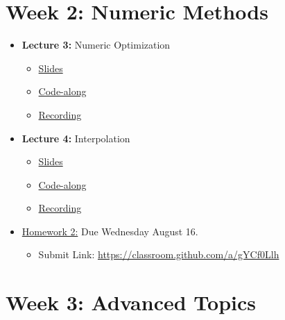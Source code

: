 \documentclass[
]{book}
\providecommand{\tightlist}{%
  \setlength{\itemsep}{0pt}\setlength{\parskip}{0pt}}
\begin{document}
\hypertarget{week-2-numeric-methods-1}{%
\section{Week 2: Numeric Methods}\label{week-2-numeric-methods-1}}

\begin{itemize}
\tightlist
\item
  \textbf{Lecture 3:} Numeric Optimization

  \begin{itemize}
  \tightlist
  \item
    \href{https://kevinghunt.github.io/ComputationCamp/lectures/Lecture3.html}{Slides}
  \item
    \href{https://kevinghunt.github.io/ComputationCamp/codealongs/CodeAlong3.jl}{Code-along}
  \item
    \href{https://uwmadison.zoom.us/rec/share/xD1LsrLsUF8XtJUjPTVDA_2d52EKgQTF1a6Dc3lBOSB7JlRk4PMUi_h0oMRnMtb5.VW6mJ7BkoiC6riUk}{Recording}
  \end{itemize}
\item
  \textbf{Lecture 4:} Interpolation

  \begin{itemize}
  \tightlist
  \item
    \href{https://kevinghunt.github.io/ComputationCamp/lectures/Lecture4.html}{Slides}
  \item
    \href{https://kevinghunt.github.io/ComputationCamp/codealongs/CodeAlong4.jl}{Code-along}
  \item
    \href{https://uwmadison.zoom.us/rec/share/YNnLYBVpnTSQsMTHQGDDWx2n89gURdYXzVWM8dRyV4o91bAfmCkC8q1IT3f-jo3B.msXmwKB-ZcXcIZRL}{Recording}
  \end{itemize}
\item
  \href{https://kevinghunt.github.io/ComputationCamp/homeworks/homework2.html}{Homework 2:} Due Wednesday August 16.

  \begin{itemize}
  \tightlist
  \item
    Submit Link: \url{https://classroom.github.com/a/gYCf0Llh}
  \end{itemize}
\end{itemize}

\hypertarget{week-3-advanced-topics-1}{%
\section{Week 3: Advanced Topics}\label{week-3-advanced-topics-1}}
\end{document}
